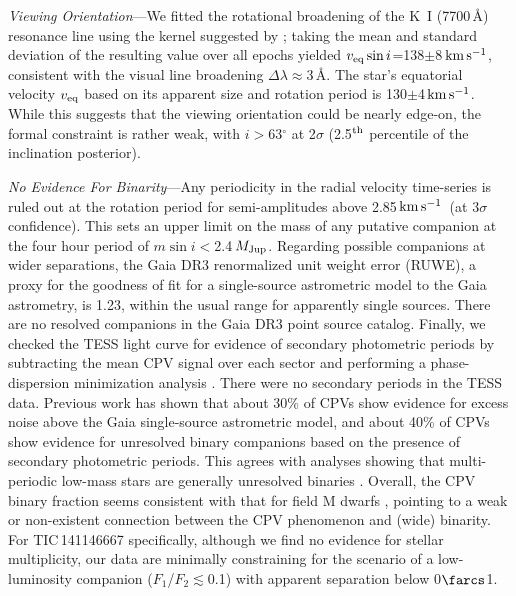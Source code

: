\documentclass[11pt,twocolumn,tighten,linenumbers]{aastex7}
\newcommand{\kms}{\ensuremath{\rm km\,s^{-1}}}
\begin{document}
{\it Viewing Orientation}---We fitted the rotational broadening of the
K~I (7700\,\AA) resonance line using the kernel suggested by
\citet{Gray2008}; taking the mean and standard deviation of the
resulting value over all epochs yielded $v_{\rm eq} \sin
i$=138$\pm$8\,\kms, consistent with the visual line broadening $\Delta
\lambda$$\approx$3\,\AA.  The star's equatorial velocity $v_{\rm eq}$
based on its apparent size and rotation period is 130$\pm$4\,\kms.
While this suggests that the viewing orientation could be nearly
edge-on, the formal constraint is rather weak, with $i$$>$63$^\circ$
at 2$\sigma$ (2.5$^{\rm th}$ percentile of the inclination posterior).


{\it No Evidence For Binarity}---Any periodicity in the radial
velocity time-series is ruled out at the rotation period for
semi-amplitudes above 2.85\,\kms\ (at 3$\sigma$ confidence).  This
sets an upper limit on the mass of any putative companion at the four
hour period of $m \sin i $$<$2.4\,$M_{\rm Jup}$.  Regarding possible
companions at wider separations, the Gaia DR3 renormalized unit weight
error (RUWE), a proxy for the goodness of fit for a single-source
astrometric model to the Gaia astrometry, is 1.23, within the usual
range for apparently single sources.  There are no resolved companions
in the Gaia DR3 point source catalog.  Finally, we checked the TESS
light curve for evidence of secondary photometric periods by
subtracting the mean CPV signal over each sector and performing a
phase-dispersion minimization analysis
\citep{Stellingwerf1978,2021zndo...1011188B}.  There were no secondary
periods in the TESS data.  Previous work \citep{Bouma2024} has shown
that about 30\% of CPVs show evidence for excess noise above the Gaia
single-source astrometric model, and about 40\% of CPVs show evidence
for unresolved binary companions based on the presence of secondary
photometric periods.  This agrees with analyses showing that
multi-periodic low-mass stars are generally unresolved binaries
\citep{Tokovinin2018}.  Overall, the CPV binary fraction seems
consistent with that for field M dwarfs \citep{Winters2019}, pointing
to a weak or non-existent connection between the CPV phenomenon and
(wide) binarity.  For TIC\,141146667 specifically, although we find no
evidence for stellar multiplicity, our data are minimally constraining
for the scenario of a low-luminosity companion
($F_1$/$F_2$$\lesssim$0.1) with apparent separation below 0$\farcs$1.
\end{document}
